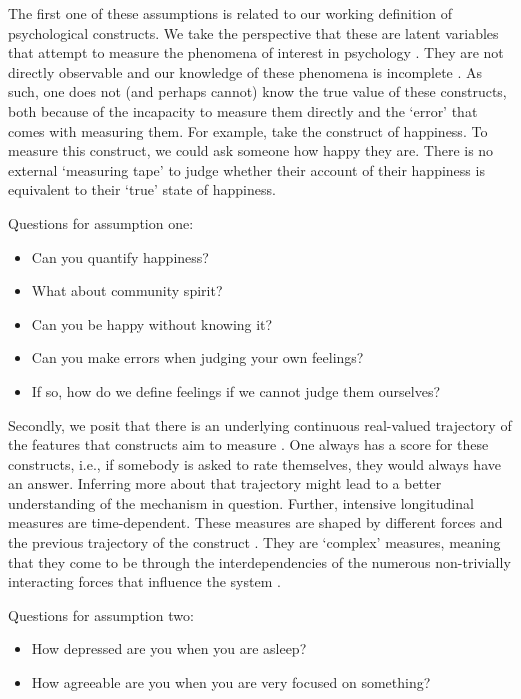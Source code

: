 \documentclass[utf8]{FrontiersinVancouver}
\begin{document}
The first one of these assumptions is related to our working definition of psychological constructs. We take the perspective that these are latent variables that attempt to measure the phenomena of interest in psychology \citep{borsboomLatentVariableTheory2008}. They are not directly observable and our knowledge of these phenomena is incomplete \citep{friedWhatArePsychological2017, maraunAugustinianMethodologicalFamily2009}. As such, one does not (and perhaps cannot) know the true value of these constructs, both because of the incapacity to measure them directly and the `error' that comes with measuring them. For example, take the construct of happiness. To measure this construct, we could ask someone how happy they are. There is no external `measuring tape' to judge whether their account of their happiness is equivalent to their `true' state of happiness.

\begin{framed} 
    Questions for assumption one:
    \begin{itemize}
        \item Can you quantify happiness?
        \item What about community spirit?
        \item Can you be happy without knowing it?
        \item Can you make errors when judging your own feelings?
        \item If so, how do we define feelings if we cannot judge them ourselves?
    \end{itemize}
\end{framed}

Secondly, we posit that there is an underlying continuous real-valued trajectory of the features that constructs aim to measure \citep{hamakerNoTimePresent2017}. One always has a score for these constructs, i.e., if somebody is asked to rate themselves, they would always have an answer. Inferring more about that trajectory might lead to a better understanding of the mechanism in question. Further, intensive longitudinal measures are time-dependent. These measures are shaped by different forces and the previous trajectory of the construct \citep{olthofComplexityPsychologicalSelfratings2020b}. They are `complex' measures, meaning that they come to be through the interdependencies of the numerous non-trivially interacting forces that influence the system \citep{olthofComplexityTheoryPsychopathology2023}. 

\begin{framed}
    Questions for assumption two:
    \begin{itemize}
        \item How depressed are you when you are asleep?
        \item How agreeable are you when you are very focused on something?
    \end{itemize}
\end{framed}
\end{document}
